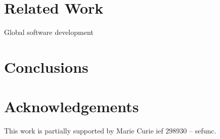 \documentclass{sig-alternate}
\begin{document}
\section{Related Work}

\cite{Bird09}
\cite{Cornf10}
\cite{Dabbi12}
\cite{Bird12}
\cite{Barr12}
\cite{Buffe99}
\cite{Mens02}
\cite{Shiha12}

Global software development
\section{Conclusions}

\section*{Acknowledgements}
This work is partially supported by Marie Curie {\sc ief} 298930 -- {\sc sefunc}.



\end{document}
